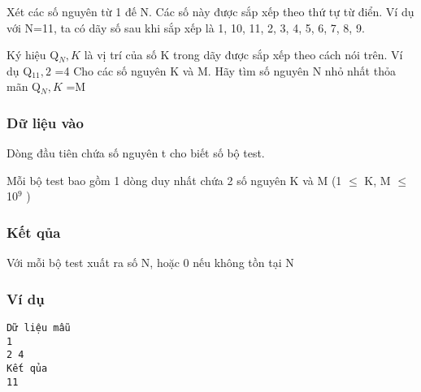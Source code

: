 

Xét các số nguyên từ 1 đế N. Các số này được sắp xếp theo thứ tự từ điển. Ví dụ với N=11, ta có dãy số sau khi sắp xếp là 1, 10, 11, 2, 3, 4, 5, 6, 7, 8, 9.

Ký hiệu Q$_N,K $ là vị trí của số K trong dãy được sắp xếp theo cách nói trên. Ví dụ Q$_11,2 $ =4 Cho các số nguyên K và M. Hãy tìm số nguyên N nhỏ nhất thỏa mãn Q$_N,K $ =M

\subsubsection{Dữ liệu vào}

Dòng đầu tiên chứa số nguyên t cho biết số bộ test.

Mỗi bộ test bao gồm 1 dòng duy nhất chứa 2 số nguyên K và M (1  $\le$  K, M  $\le$  10$^9 $ )

\subsubsection{Kết qủa}

Với mỗi bộ test xuất ra số N, hoặc 0 nếu không tồn tại N

\subsubsection{Ví dụ}
\begin{verbatim}
Dữ liệu mẫu
1
2 4
Kết qủa
11
\end{verbatim}
